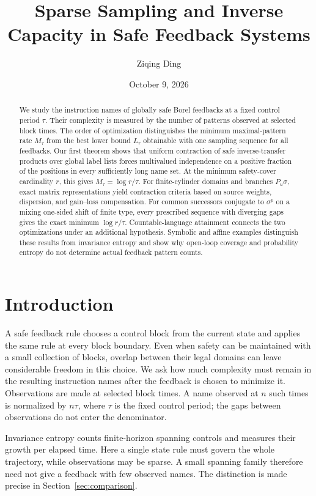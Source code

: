\documentclass[11pt,reqno]{amsart}
\title[Sparse sampling and inverse capacity]{Sparse Sampling and Inverse Capacity in Safe Feedback Systems}
\author{Ziqing Ding}
\date{October 9, 2026}
\numberwithin{equation}{section}
\theoremstyle{definition}
\begin{document}
\begin{abstract}
We study the instruction names of globally safe Borel feedbacks at a
fixed control period $\tau$. Their complexity is measured by the number
of patterns observed at selected block times. The order of optimization
distinguishes the minimum maximal-pattern rate $M_\tau$ from the best
lower bound $L_\tau$ obtainable with one sampling sequence for all
feedbacks. Our first theorem shows that uniform contraction of safe inverse-transfer
products over global label lists forces multivalued independence on a
positive fraction of the positions in every sufficiently long name set.
At the minimum safety-cover cardinality $r$, this gives
$M_\tau=\log r/\tau$. For finite-cylinder domains and branches
$P_u\sigma$, exact matrix representations yield contraction criteria
based on source weights, dispersion, and gain--loss compensation.
For common successors conjugate to $\sigma^p$ on a mixing one-sided
shift of finite type, every prescribed sequence with diverging gaps
gives the exact minimum $\log r/\tau$. Countable-language attainment
connects the two optimizations under an additional hypothesis.
Symbolic and affine examples distinguish these
results from invariance entropy and show why open-loop coverage and
probability entropy do not determine actual feedback pattern counts.
\end{abstract}
\maketitle

\section{Introduction}\label{sec:intro}

A safe feedback rule chooses a control block from the current state
and applies the same rule at every block boundary. Even when safety
can be maintained with a small collection of blocks, overlap between
their legal domains can leave considerable freedom in this choice.
We ask how much complexity must remain in the resulting instruction
names after the feedback is chosen to minimize it. Observations are
made at selected block times. A name observed at $n$ such times is
normalized by $n\tau$, where $\tau$ is the fixed control period; the
gaps between observations do not enter the denominator.

Invariance entropy counts finite-horizon spanning controls and measures
their growth per elapsed time. Here a single state rule must govern the
whole trajectory, while observations may be sparse. A small spanning
family therefore need not give a feedback with few observed names.
The distinction is made precise in Section~\ref{sec:comparison}.
\end{document}

